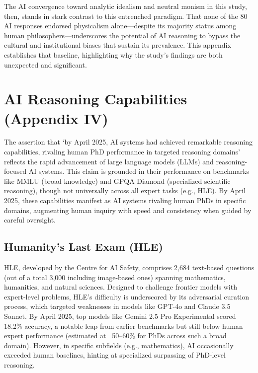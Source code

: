 \documentclass[11pt]{article}
\begin{document}
The AI convergence toward analytic idealism and neutral monism in this study, then, stands in stark contrast to this entrenched paradigm. That none of the 80 AI responses endorsed physicalism alone—despite its majority status among human philosophers—underscores the potential of AI reasoning to bypass the cultural and institutional biases that sustain its prevalence. This appendix establishes that baseline, highlighting why the study’s findings are both unexpected and significant.

\section{AI Reasoning Capabilities (Appendix IV)}
The assertion that ‘by April 2025, AI systems had achieved remarkable reasoning capabilities, rivaling human PhD performance in targeted reasoning domains’ reflects the rapid advancement of large language models (LLMs) and reasoning-focused AI systems. This claim is grounded in their performance on benchmarks like MMLU (broad knowledge) and GPQA Diamond (specialized scientific reasoning), though not universally across all expert tasks (e.g., HLE). By April 2025, these capabilities manifest as AI systems rivaling human PhDs in specific domains, augmenting human inquiry with speed and consistency when guided by careful oversight.

\subsection{Humanity’s Last Exam (HLE)}
HLE, developed by the Centre for AI Safety, comprises 2,684 text-based questions (out of a total 3,000 including image-based ones) spanning mathematics, humanities, and natural sciences. Designed to challenge frontier models with expert-level problems, HLE’s difficulty is underscored by its adversarial curation process, which targeted weaknesses in models like GPT-4o and Claude 3.5 Sonnet. By April 2025, top models like Gemini 2.5 Pro Experimental scored 18.2\% accuracy, a notable leap from earlier benchmarks but still below human expert performance (estimated at ~50–60\% for PhDs across such a broad domain). However, in specific subfields (e.g., mathematics), AI occasionally exceeded human baselines, hinting at specialized surpassing of PhD-level reasoning.
\end{document}
